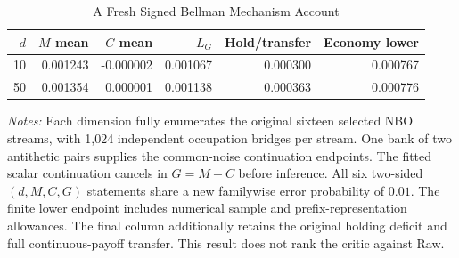 \begin{table}[!htbp]
\centering
\footnotesize
\caption{A Fresh Signed Bellman Mechanism Account}\label{tab:r16signedmain}
\begin{tabular}{rrrrrr}
\toprule
$d$ & $M$ mean & $C$ mean & $L_G$ & Hold/transfer & Economy lower \\
\midrule
10 & 0.001243 & -0.000002 & 0.001067 & 0.000300 & 0.000767 \\
50 & 0.001354 & 0.000001 & 0.001138 & 0.000363 & 0.000776 \\
\bottomrule
\end{tabular}
\begin{minipage}{0.97\linewidth}\footnotesize
\emph{Notes:} Each dimension fully enumerates the original sixteen selected NBO streams, with 1,024 independent occupation bridges per stream. One bank of two antithetic pairs supplies the common-noise continuation endpoints. The fitted scalar continuation cancels in $G=M-C$ before inference. All six two-sided $(d,M,C,G)$ statements share a new familywise error probability of $0.01$. The finite lower endpoint includes numerical sample and prefix-representation allowances. The final column additionally retains the original holding deficit and full continuous-payoff transfer. This result does not rank the critic against Raw.
\end{minipage}
\end{table}
